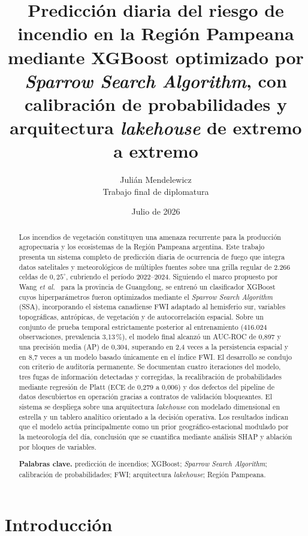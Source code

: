 \documentclass[11pt,a4paper]{article}
\title{\textbf{Predicción diaria del riesgo de incendio en la Región Pampeana
mediante XGBoost optimizado por \emph{Sparrow Search Algorithm}, con
calibración de probabilidades y arquitectura \emph{lakehouse} de extremo a
extremo}}
\author{Julián Mendelewicz\\
\small Trabajo final de diplomatura}
\date{Julio de 2026}
\begin{document}
\maketitle

\begin{abstract}
\noindent
Los incendios de vegetación constituyen una amenaza recurrente para la
producción agropecuaria y los ecosistemas de la Región Pampeana argentina.
Este trabajo presenta un sistema completo de predicción diaria de ocurrencia
de fuego que integra datos satelitales y meteorológicos de múltiples fuentes
sobre una grilla regular de 2.266 celdas de $0{,}25^{\circ}$, cubriendo el
período 2022--2024. Siguiendo el marco propuesto por Wang
\emph{et al.}~\cite{wang2026} para la provincia de Guangdong, se entrenó un
clasificador XGBoost cuyos hiperparámetros fueron optimizados mediante el
\emph{Sparrow Search Algorithm} (SSA), incorporando el sistema canadiense
FWI adaptado al hemisferio sur, variables topográficas, antrópicas, de
vegetación y de autocorrelación espacial. Sobre un conjunto de prueba
temporal estrictamente posterior al entrenamiento (416.024 observaciones,
prevalencia 3,13\,\%), el modelo final alcanzó un AUC-ROC de 0,897 y una
precisión media (AP) de 0,304, superando en 2,4 veces a la persistencia
espacial y en 8,7 veces a un modelo basado únicamente en el índice FWI. El
desarrollo se condujo con criterio de auditoría permanente. Se documentan
cuatro iteraciones del modelo, tres fugas de información detectadas y
corregidas, la recalibración de probabilidades mediante regresión de Platt
(ECE de 0,279 a 0,006) y dos defectos del pipeline de datos descubiertos en
operación gracias a contratos de validación bloqueantes. El sistema se
despliega sobre una arquitectura \emph{lakehouse} con modelado dimensional
en estrella y un tablero analítico orientado a la decisión operativa. Los
resultados indican que el modelo actúa principalmente como un prior
geográfico-estacional modulado por la meteorología del día, conclusión que
se cuantifica mediante análisis SHAP y ablación por bloques de variables.
\medskip

\noindent\textbf{Palabras clave.} predicción de incendios; XGBoost;
\emph{Sparrow Search Algorithm}; calibración de probabilidades; FWI;
arquitectura \emph{lakehouse}; Región Pampeana.
\end{abstract}

\section{Introducción}
\label{sec:intro}
\end{document}
